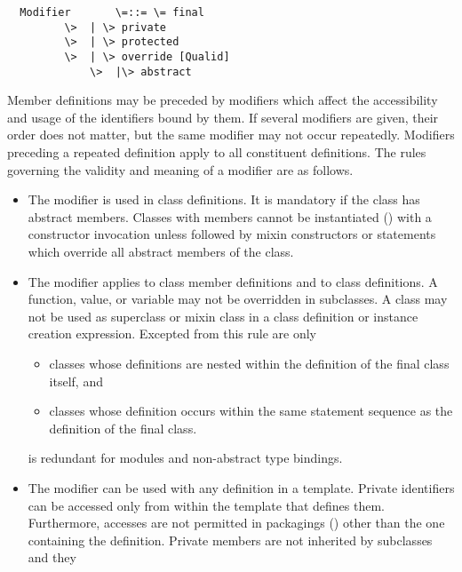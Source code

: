 \documentclass[11pt]{report}
\newcommand{\ifqualified}[1]{}
\newcommand{\iffinaltype}[1]{}
\begin{document}
\begin{itemize}
\syntax\begin{verbatim}
  Modifier       \=::= \= final
		 \>  | \> private
		 \>  | \> protected
		 \>  | \> override [Qualid]
	         \>  |\> abstract
\end{verbatim}

Member definitions may be preceded by modifiers which
affect the \ifqualified{qualified names, }accessibility and usage of the identifiers
bound by them.  If several modifiers are given, their order does not
matter, but the same modifier may not occur repeatedly.  Modifiers
preceding a repeated definition apply to all constituent definitions.
The rules governing the validity and meaning of a modifier are as
follows.
\begin{itemize}
\item
The \verb@abstract@ modifier is used in class definitions. It is
mandatory if the class has abstract members.  Classes with
\verb@abstract@ members cannot be instantiated
() with a constructor invocation unless
followed by mixin constructors or statements which override all
abstract members of the class.
\item
The \verb@final@ modifier applies to class member definitions and to
class definitions. A \verb@final@ function, value, or variable may not
be overridden in subclasses.  A
\verb@final@ class may
not be used as superclass or mixin class in a class definition or
instance creation expression.
Excepted from this rule are only
\begin{itemize}
\item classes whose definitions are nested within the definition
of the final class itself, and
\item classes whose definition occurs within the same statement
sequence as the definition of the final class.
\end{itemize}
\iffinaltype{
A non-abstract final class is also called a {\em
leaf class}.  When used in a binding of an abstract type, \verb@final@
restricts the possible instances of the abstract type to leaf
classes (see also \sref{sec:typedcl}).
}
\verb@final@ is redundant for modules and non-abstract type bindings.
\item
The \verb@private@ modifier can be used with any definition in a
template. Private identifiers can be accessed only from within the template
that defines them.  Furthermore, accesses are not permitted in
packagings () other than the one containing the
definition. Private members are not inherited by subclasses and they

\end{itemize}
\end{itemize}
\end{document}
